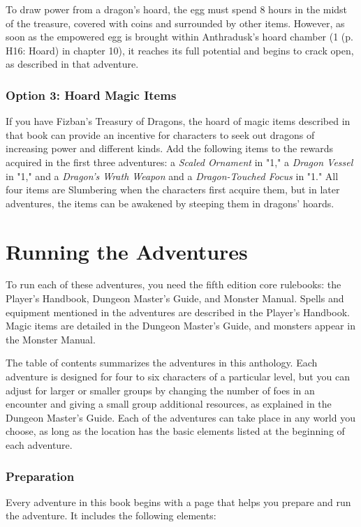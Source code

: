 \documentclass[letterpaper, 11pt, twocolumn]{dndbook}
\begin{document}
To draw power from a dragon's hoard, the egg must spend 8 hours in the midst of the treasure, covered with coins and surrounded by other items. However, as soon as the empowered egg is brought within Anthradusk's hoard chamber (1 (p. H16: Hoard) in chapter 10), it reaches its full potential and begins to crack open, as described in that adventure.

\subsubsection{Option 3: Hoard Magic Items}

If you have Fizban's Treasury of Dragons, the hoard of magic items described in that book can provide an incentive for characters to seek out dragons of increasing power and different kinds. Add the following items to the rewards acquired in the first three adventures: a \textit{Scaled Ornament} in "1," a \textit{Dragon Vessel} in "1," and a \textit{Dragon's Wrath Weapon} and a \textit{Dragon-Touched Focus} in "1." All four items are Slumbering when the characters first acquire them, but in later adventures, the items can be awakened by steeping them in dragons' hoards.
\section{Running the Adventures}

To run each of these adventures, you need the fifth edition core rulebooks: the Player's Handbook, Dungeon Master's Guide, and Monster Manual. Spells and equipment mentioned in the adventures are described in the Player's Handbook. Magic items are detailed in the Dungeon Master's Guide, and monsters appear in the Monster Manual.

The table of contents summarizes the adventures in this anthology. Each adventure is designed for four to six characters of a particular level, but you can adjust for larger or smaller groups by changing the number of foes in an encounter and giving a small group additional resources, as explained in the Dungeon Master's Guide. Each of the adventures can take place in any world you choose, as long as the location has the basic elements listed at the beginning of each adventure.

\subsubsection{Preparation}

Every adventure in this book begins with a page that helps you prepare and run the adventure. It includes the following elements:
\end{document}
